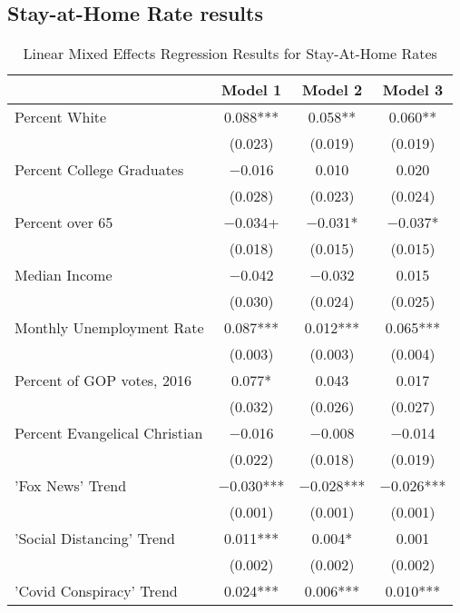 \hypertarget{stay-at-home-rate-results}{%
\subsection{Stay-at-Home Rate results}\label{stay-at-home-rate-results}}

\begin{table}[!h]

\caption{\label{tab:google-tab}Linear Mixed Effects Regression Results for Stay-At-Home Rates}
\centering
\fontsize{8}{10}\selectfont
\begin{tabular}[t]{lccc}
\toprule
  & Model 1 & Model 2 & Model 3\\
\midrule
Percent White & \num{0.088}*** & \num{0.058}** & \num{0.060}**\\
 & (\num{0.023}) & (\num{0.019}) & (\num{0.019})\\
Percent College Graduates & \num{-0.016} & \num{0.010} & \num{0.020}\\
 & (\num{0.028}) & (\num{0.023}) & (\num{0.024})\\
Percent over 65 & \num{-0.034}+ & \num{-0.031}* & \num{-0.037}*\\
 & (\num{0.018}) & (\num{0.015}) & (\num{0.015})\\
Median Income & \num{-0.042} & \num{-0.032} & \num{0.015}\\
 & (\num{0.030}) & (\num{0.024}) & (\num{0.025})\\
Monthly Unemployment Rate & \num{0.087}*** & \num{0.012}*** & \num{0.065}***\\
 & (\num{0.003}) & (\num{0.003}) & (\num{0.004})\\
Percent of GOP votes, 2016 & \num{0.077}* & \num{0.043} & \num{0.017}\\
 & (\num{0.032}) & (\num{0.026}) & (\num{0.027})\\
Percent Evangelical Christian & \num{-0.016} & \num{-0.008} & \num{-0.014}\\
 & (\num{0.022}) & (\num{0.018}) & (\num{0.019})\\
'Fox News' Trend & \num{-0.030}*** & \num{-0.028}*** & \num{-0.026}***\\
 & (\num{0.001}) & (\num{0.001}) & \vphantom{1} (\num{0.001})\\
'Social Distancing' Trend & \num{0.011}*** & \num{0.004}* & \num{0.001}\\
 & (\num{0.002}) & (\num{0.002}) & \vphantom{1} (\num{0.002})\\
'Covid Conspiracy' Trend & \num{0.024}*** & \num{0.006}*** & \num{0.010}***\\

\end{tabular}
\end{table}
